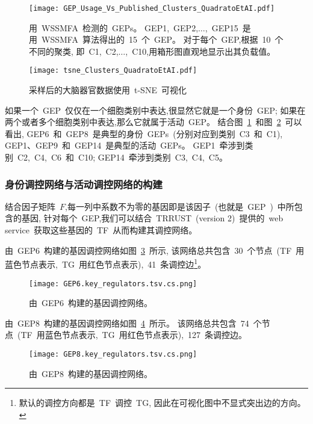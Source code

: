 \begin{figure}[!htbp]
    \centering
    \texttt{[image: GEP\_Usage\_Vs\_Published\_Clusters\_QuadratoEtAI.pdf]}
    \caption{
    用~WSSMFA~检测的~GEPs。
    GEP1,~GEP2,$\ldots$,~GEP15~是用~WSSMFA~算法得出的~15~个~GEP。
    对于每个~GEP,根据~10~个不同的聚类,
    即~C1,~C2,$\ldots$,~C10,用箱形图直观地显示出其负载值。 
    }
    \label{fig:gep-gep}
\end{figure}


\begin{figure}[!htbp]
    \centering
    \texttt{[image: tsne\_Clusters\_QuadratoEtAI.pdf]}
    \caption{
    采样后的大脑器官数据使用~t-SNE~可视化
    }
    \label{fig:gep-tsne}
\end{figure}

如果一个~GEP~仅仅在一个细胞类别中表达,很显然它就是一个身份~GEP;
如果在两个或者多个细胞类别中表达,那么它就属于活动~GEP。
结合图~\ref{fig:gep-gep}~和图~\ref{fig:gep-tsne}~可以看出, 
GEP6~和~GEP8~是典型的身份~GEPs~(分别对应到类别~C3~和~C1), GEP1、GEP9~和~GEP14~是典型的活动~GEPs。
GEP1~牵涉到类别~C2,~C4,~C6~和~C10; GEP14~牵涉到类别~C3,~C4,~C5。

\subsubsection{身份调控网络与活动调控网络的构建}
结合因子矩阵~$F$,每一列中系数不为零的基因即是该因子~(也就是~GEP~)~中所包含的基因,
针对每个~GEP,我们可以结合~TRRUST~(version 2)~提供的~web service~获取这些基因的~TF~从而构建其调控网络。

由~GEP6~构建的基因调控网络如图~\ref{fig:gep-grn-gep6}~所示,
该网络总共包含~30~个节点~(TF~用蓝色节点表示,~TG~用红色节点表示),~41~条调控边\footnote{默认的调控方向都是~TF~调控~TG, 因此在可视化图中不显式突出边的方向。
}。
\begin{figure}[!htbp]
    \centering
    \texttt{[image: GEP6.key\_regulators.tsv.cs.png]}
    \caption{
    由~GEP6~构建的基因调控网络。
    }
    \label{fig:gep-grn-gep6}
\end{figure}

由~GEP8~构建的基因调控网络如图~\ref{fig:gep-grn-gep8}~所示。
该网络总共包含~74~个节点~(TF~用蓝色节点表示,~TG~用红色节点表示),~127~条调控边。
\begin{figure}[!htbp]
    \centering
    \texttt{[image: GEP8.key\_regulators.tsv.cs.png]}
    \caption{
    由~GEP8~构建的基因调控网络。
    }
    \label{fig:gep-grn-gep8}
\end{figure}

